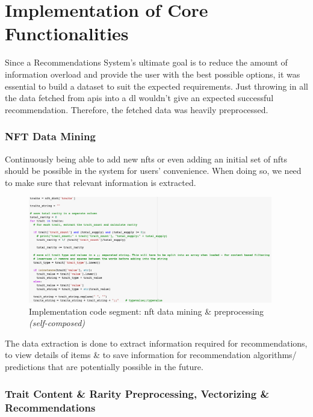 \section{Implementation of Core Functionalities}

Since a Recommendations System's ultimate goal is to reduce the amount of information overload and provide the user with the best possible options, it was essential to build a dataset to suit the expected requirements. Just throwing in all the data fetched from \gls{api}s into a \gls{dl} wouldn't give an expected successful recommendation. Therefore, the fetched data was heavily preprocessed.

\subsubsection{NFT Data Mining}
Continuously being able to add new \gls{nft}s or even adding an initial set of \gls{nft}s should be possible in the system for users' convenience. When doing so, we need to make sure that relevant information is extracted.

\begin{figure}[h!]
\centering
\includegraphics[width=0.95\textwidth]{images/Implementation/code/nft-data-extraction.png}
\caption{Implementation code segment: \gls{nft} data mining \& preprocessing \textit{(self-composed)}}
\label{fig:code-nft-data-mining}
\end{figure}

The data extraction is done to extract information required for recommendations, to view details of items \& to save information for recommendation algorithms/ predictions that are potentially possible in the future.

\subsubsection{Trait Content \& Rarity Preprocessing, Vectorizing \& Recommendations}


